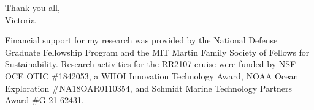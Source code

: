 \begin{flushright}
Thank you all,\\ 
Victoria
\end{flushright}

\vspace{1em}

\noindent Financial support for my research was provided by the National Defense Graduate Fellowship Program and the MIT Martin Family Society of Fellows for Sustainability. Research activities for the RR2107 cruise were funded by NSF OCE OTIC \#1842053, a WHOI Innovation Technology Award, NOAA Ocean Exploration \#NA18OAR0110354, and Schmidt Marine Technology Partners Award \#G-21-62431. 
